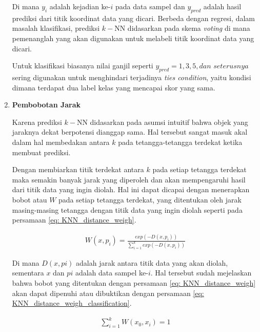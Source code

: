 \begin{enumerate}[label=\textbf{\alph*).}]
	Di mana $y_{i}$ adalah kejadian ke-$i$ pada data sampel dan $y_{pred}$ adalah hasil prediksi dari titik koordinat data yang dicari. Berbeda dengan regresi, dalam masalah klasifikasi, prediksi $k-$NN didasarkan pada skema \textit{voting} di mana pemenanglah yang akan digunakan untuk melabeli titik koordinat data yang dicari.
	\vspace{1ex}
	
	Untuk klasifikasi biasanya nilai ganjil seperti $y_{pred} = 1, 3, 5, dan$ $seterusnya$ sering digunakan untuk menghindari terjadinya \textit{ties condition}, yaitu kondisi dimana terdapat dua label kelas yang mencapai skor yang sama.
	\vspace{1ex}
	
	\item \textbf{Pembobotan Jarak}
	
	Karena prediksi $k-$NN didasarkan pada asumsi intuitif bahwa objek yang jaraknya dekat berpotensi dianggap sama. Hal tersebut sangat masuk akal dalam hal membedakan antara $k$ pada tetangga-tetangga terdekat ketika membuat prediksi. 
	\vspace{1ex}
	
	Dengan membiarkan titik terdekat antara $k$ pada setiap tetangga terdekat maka semakin banyak jarak yang diperoleh dan akan mempengaruhi hasil dari titik data yang ingin diolah. Hal ini dapat dicapai dengan menerapkan bobot atau $W$ pada setiap tetangga terdekat, yang ditentukan oleh jarak masing-masing tetangga dengan titik data yang ingin diolah seperti pada persamaan \ref{eq: KNN_distance_weigh}.
	\vspace{1ex}
	
	\begin{equation}\label{eq: KNN_distance_weigh}
	\begin{split}
	W(x, p_{i}) = \frac{exp(-D(x, p_{i}))}{\sum_{i = 1}^{k}exp(-D(x, p_{i}))}
	\end{split}
	\end{equation}
	
	Di mana $D(x, pi)$ adalah jarak antara titik data yang akan diolah, sementara $x$ dan $pi$ adalah data sampel ke-$i$. Hal tersebut sudah mejelaskan bahwa bobot yang ditentukan dengan persamaan \ref{eq: KNN_distance_weigh} akan dapat dipenuhi atau dibuktikan dengan persamaan \ref{eq: KNN_distance_weigh_classification}.
	
	\begin{equation}\label{eq: KNN_distance_weigh_classification}
	\begin{split}
	\sum_{i = 1}^{k} W(x_{0}, x_{i}) = 1
	\end{split}
	\end{equation}
	

\end{enumerate}
